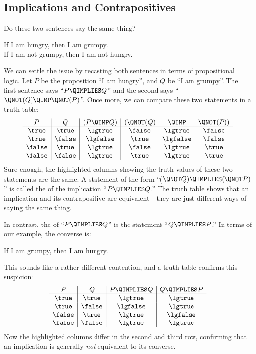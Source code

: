 \subsection{Implications and Contrapositives}\label{implication_sec}
Do these two sentences say the same thing?
%
\begin{center}
If I am hungry, then I am grumpy. \\
If I am not grumpy, then I am not hungry.
\end{center}
%
We can settle the issue by recasting both sentences in terms of
propositional logic.  Let $P$ be the proposition ``I am hungry'', and $Q$
be ``I am grumpy''.  The first sentence says ``$P \QIMPLIES Q$'' and the
second says ``$\QNOT(Q) \QIMP \QNOT(P)$''.  Once more, we can compare
these two statements in a truth table:
%
\[
\begin{array}{c|c|c|ccc}
   P   &   Q    & (P  \QIMP  Q) & (\QNOT(Q) & \QIMP & \QNOT(P)) \\ \hline
\true  & \true  &     \lgtrue   &  \false   & \lgtrue  &  \false\\
\true  & \false &     \lgfalse  &  \true    & \lgfalse &  \false\\
\false & \true  &     \lgtrue   &  \false   & \lgtrue  &  \true \\
\false & \false &     \lgtrue   &  \true    & \lgtrue  &  \true \\
\end{array}
\]
%
Sure enough, the highlighted columns showing the truth values of these two
statements are the same.  A statement of the form ``($\QNOT Q) \QIMPLIES
(\QNOT P)$'' is called the  of the implication ``$P
\QIMPLIES Q$.''  The truth table shows that an implication and its
contrapositive are equivalent---they are just different ways of saying
the same thing.

In contrast, the  of ``$P \QIMPLIES Q$'' is the statement
``$Q \QIMPLIES P$.''  In terms of our example, the converse is:
%
\begin{center}
If I am grumpy, then I am hungry.
\end{center}
%
This sounds like a rather different contention, and a truth table
confirms this suspicion:
%
\[
\begin{array}{c|c|c|c}
P & Q &
    P \QIMPLIES Q &
    Q \QIMPLIES P \\ \hline
\true & \true & \lgtrue & \lgtrue \\
\true & \false & \lgfalse & \lgtrue \\
\false & \true & \lgtrue & \lgfalse \\
\false & \false & \lgtrue & \lgtrue
\end{array}
\]
%
Now the highlighted columns differ in the second and third row, confirming
that an implication is generally \textit{not} equivalent to its converse.

